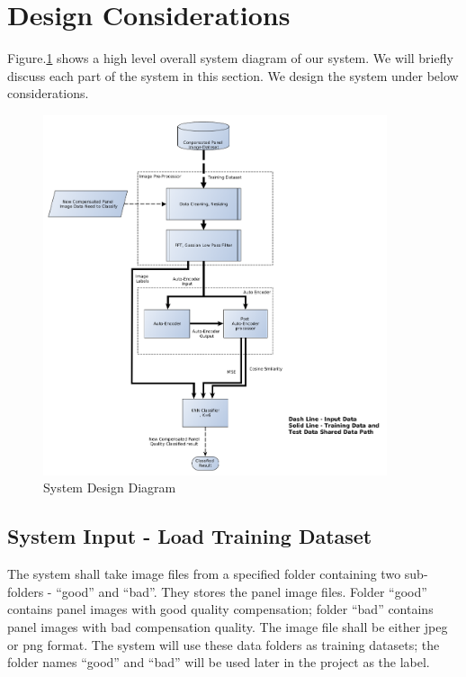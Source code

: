 \documentclass[runningheads]{llncs}
\begin{document}
\section{Design Considerations}
Figure.\ref{system-diagram} shows a high level overall system diagram of our system. We will briefly discuss each part of the system in this section. We design the system under below considerations.
\clearpage
\begin{figure}[H]
    \centering
    \includegraphics[width=0.9\textwidth]{system-diagram.png}
    \caption{System Design Diagram}
    \label{system-diagram}
\end{figure}

\subsection{System Input - Load Training Dataset}
The system shall take image files from a specified folder containing two sub-folders - “good” and “bad”. They stores the panel image files. Folder “good” contains panel images with good quality compensation; folder “bad” contains panel images with bad compensation quality. The image file shall be either jpeg or png format. The system will use these data folders as training datasets; the folder names “good” and “bad” will be used later in the project as the label.
\end{document}
